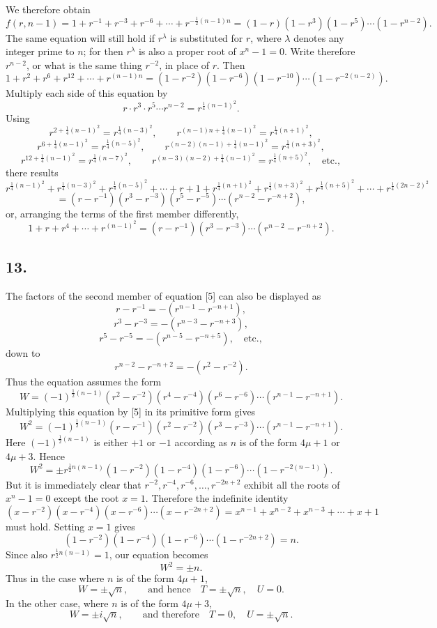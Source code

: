 \documentclass[12pt]{article}
\begin{document}
We therefore obtain
\[
f(r,n-1)=1+r^{-1}+r^{-3}+r^{-6}+\cdots+r^{-\frac12(n-1)n}
=(1-r)(1-r^3)(1-r^5)\cdots(1-r^{n-2}).
\]
The same equation will still hold if $r^\lambda$ is substituted for $r$, where $\lambda$ denotes any integer prime to $n$; for then $r^\lambda$ is also a proper root of $x^n-1=0$. Write therefore $r^{n-2}$, or what is the same thing $r^{-2}$, in place of $r$. Then
\[
1+r^2+r^6+r^{12}+\cdots+r^{(n-1)n}
=(1-r^{-2})(1-r^{-6})(1-r^{-10})\cdots(1-r^{-2(n-2)}).
\]
Multiply each side of this equation by
\[
r\cdot r^3\cdot r^5\cdots r^{n-2}=r^{\frac14(n-1)^2}.
\]
Using
\[
r^{2+\frac14(n-1)^2}=r^{\frac14(n-3)^2},\qquad
r^{(n-1)n+\frac14(n-1)^2}=r^{\frac14(n+1)^2},
\]
\[
r^{6+\frac14(n-1)^2}=r^{\frac14(n-5)^2},\qquad
r^{(n-2)(n-1)+\frac14(n-1)^2}=r^{\frac14(n+3)^2},
\]
\[
r^{12+\frac14(n-1)^2}=r^{\frac14(n-7)^2},\qquad
r^{(n-3)(n-2)+\frac14(n-1)^2}=r^{\frac14(n+5)^2},\quad\text{etc.},
\]
there results
\[
r^{\frac14(n-1)^2}+r^{\frac14(n-3)^2}+r^{\frac14(n-5)^2}+\cdots+r+1
+r^{\frac14(n+1)^2}+r^{\frac14(n+3)^2}+r^{\frac14(n+5)^2}+\cdots+r^{\frac14(2n-2)^2}
\]
\[
=(r-r^{-1})(r^3-r^{-3})(r^5-r^{-5})\cdots(r^{n-2}-r^{-n+2}),
\]
or, arranging the terms of the first member differently,
\[
1+r+r^4+\cdots+r^{(n-1)^2}=(r-r^{-1})(r^3-r^{-3})\cdots(r^{n-2}-r^{-n+2}). \tag{5}
\]

\subsection*{13.}

The factors of the second member of equation [5] can also be displayed as
\[
r-r^{-1}=-(r^{n-1}-r^{-n+1}),
\]
\[
r^3-r^{-3}=-(r^{n-3}-r^{-n+3}),
\]
\[
r^5-r^{-5}=-(r^{n-5}-r^{-n+5}),\quad\text{etc.},
\]
down to
\[
r^{n-2}-r^{-n+2}=-(r^2-r^{-2}).
\]
Thus the equation assumes the form
\[
W=(-1)^{\frac12(n-1)}(r^2-r^{-2})(r^4-r^{-4})(r^6-r^{-6})\cdots(r^{n-1}-r^{-n+1}).
\]
Multiplying this equation by [5] in its primitive form gives
\[
W^2=(-1)^{\frac12(n-1)}(r-r^{-1})(r^2-r^{-2})(r^3-r^{-3})\cdots(r^{n-1}-r^{-n+1}).
\]
Here $(-1)^{\frac12(n-1)}$ is either $+1$ or $-1$ according as $n$ is of the form $4\mu+1$ or $4\mu+3$. Hence
\[
W^2=\pm r^{\frac12 n(n-1)}(1-r^{-2})(1-r^{-4})(1-r^{-6})\cdots(1-r^{-2(n-1)}).
\]
But it is immediately clear that $r^{-2},r^{-4},r^{-6},\ldots,r^{-2n+2}$ exhibit all the roots of $x^n-1=0$ except the root $x=1$. Therefore the indefinite identity
\[
(x-r^{-2})(x-r^{-4})(x-r^{-6})\cdots(x-r^{-2n+2})
=x^{n-1}+x^{n-2}+x^{n-3}+\cdots+x+1
\]
must hold. Setting $x=1$ gives
\[
(1-r^{-2})(1-r^{-4})(1-r^{-6})\cdots(1-r^{-2n+2})=n.
\]
Since also $r^{\frac12 n(n-1)}=1$, our equation becomes
\[
W^2=\pm n. \tag{6}
\]
Thus in the case where $n$ is of the form $4\mu+1$,
\[
W=\pm\sqrt n,\qquad\text{and hence}\quad T=\pm\sqrt n,\quad U=0.
\]
In the other case, where $n$ is of the form $4\mu+3$,
\[
W=\pm i\sqrt n,\qquad\text{and therefore}\quad T=0,\quad U=\pm\sqrt n.
\]
\end{document}
